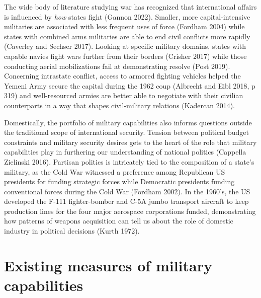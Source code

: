 \documentclass[
]{article}
\begin{document}
The wide body of literature studying war has recognized that international affairs is influenced by \emph{how} states fight (Gannon 2022). Smaller, more capital-intensive militaries are associated with less frequent uses of force (Fordham 2004) while states with combined arms militaries are able to end civil conflicts more rapidly (Caverley and Sechser 2017). Looking at specific military domains, states with capable navies fight wars further from their borders (Crisher 2017) while those conducting aerial mobilizations fail at demonstrating resolve (Post 2019). Concerning intrastate conflict, access to armored fighting vehicles helped the Yemeni Army secure the capital during the 1962 coup (Albrecht and Eibl 2018, p 319) and well-resourced armies are better able to negotiate with their civilian counterparts in a way that shapes civil-military relations (Kadercan 2014).

Domestically, the portfolio of military capabilities also informs questions outside the traditional scope of international security. Tension between political budget constraints and military security desires gets to the heart of the role that military capabilities play in furthering our understanding of national politics (Cappella Zielinski 2016). Partisan politics is intricately tied to the composition of a state's military, as the Cold War witnessed a preference among Republican US presidents for funding strategic forces while Democratic presidents funding conventional forces during the Cold War (Fordham 2002). In the 1960's, the US developed the F-111 fighter-bomber and C-5A jumbo transport aircraft to keep production lines for the four major aerospace corporations funded, demonstrating how patterns of weapons acquisition can tell us about the role of domestic industry in political decisions (Kurth 1972).

\hypertarget{existing-measures-of-military-capabilities}{%
\section{Existing measures of military capabilities}\label{existing-measures-of-military-capabilities}}
\end{document}
